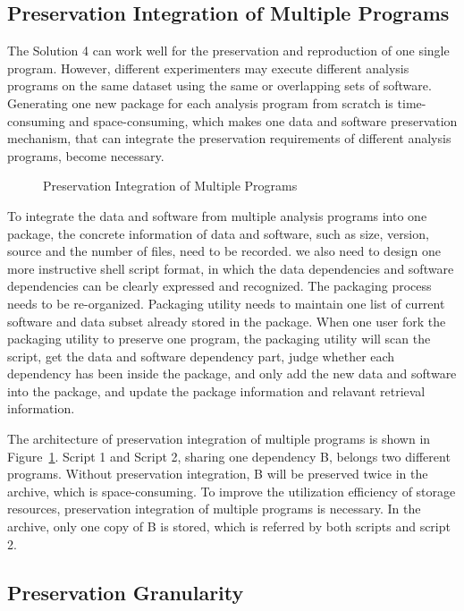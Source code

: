 \documentclass{acm_proc_article-sp}
\begin{document}
\subsection{Preservation Integration of Multiple Programs}
The Solution 4 can work well for the preservation and reproduction of one single program. However, different experimenters may execute different analysis programs on the same dataset using the same or overlapping sets of software. Generating one new package for each analysis program from scratch is time-consuming and space-consuming, which makes one data and software preservation mechanism, that can integrate the preservation requirements of different analysis programs, become necessary. 

\begin{figure}
\centering
{}
\caption{Preservation Integration of Multiple Programs}
\label{fig:Preservation integration}
\end{figure}

To integrate the data and software from multiple analysis programs into one
package, the concrete information of data and software, such as size, version,
source and the number of files, need to be recorded. we also need to design one
more instructive shell script format, in which the data dependencies and
software dependencies can be clearly expressed and recognized. The packaging
process needs to be re-organized. Packaging utility needs to maintain one list
of current software and data subset already stored in the package. When one
user fork the packaging utility to preserve one program, the
packaging utility will scan the script, get the data and software dependency
part, judge whether each dependency has been inside the package, and only add
the new data and software into the package, and update the package information
and relavant retrieval information.

The architecture of preservation integration of multiple programs is shown in
Figure~\ref{fig:Preservation integration}. Script 1 and Script 2, sharing one
dependency B, belongs two different programs. Without preservation
integration, B will be preserved twice in the archive, which is
space-consuming. To improve the utilization efficiency of storage resources,
preservation integration of multiple programs is necessary. In the archive,
only one copy of B is stored, which is referred by both scripts and script 2.

\subsection{Preservation Granularity}
\end{document}
